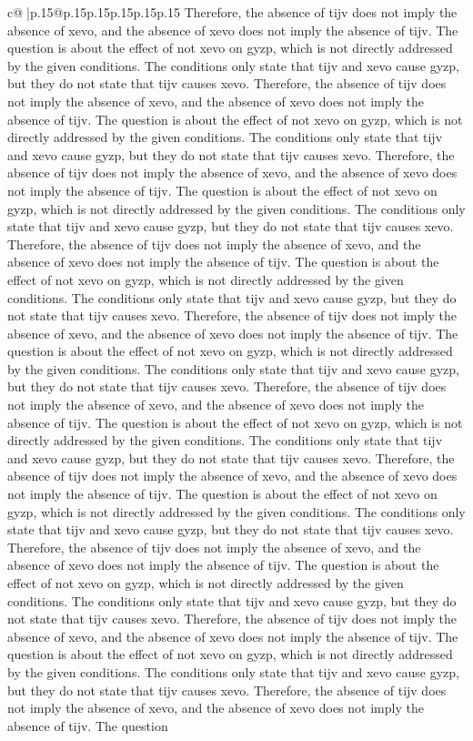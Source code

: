 \documentclass{article}
\begin{document}
{\begin{supertabular}{c@{$\;$}|p{.15\linewidth}@{}p{.15\linewidth}p{.15\linewidth}p{.15\linewidth}p{.15\linewidth}p{.15\linewidth}}
{{{Therefore, the absence of tijv does not imply the absence of xevo, and the absence of xevo does not imply the absence of tijv. The question is about the effect of not xevo on gyzp, which is not directly addressed by the given conditions. The conditions only state that tijv and xevo cause gyzp, but they do not state that tijv causes xevo. Therefore, the absence of tijv does not imply the absence of xevo, and the absence of xevo does not imply the absence of tijv. The question is about the effect of not xevo on gyzp, which is not directly addressed by the given conditions. The conditions only state that tijv and xevo cause gyzp, but they do not state that tijv causes xevo. Therefore, the absence of tijv does not imply the absence of xevo, and the absence of xevo does not imply the absence of tijv. The question is about the effect of not xevo on gyzp, which is not directly addressed by the given conditions. The conditions only state that tijv and xevo cause gyzp, but they do not state that tijv causes xevo. Therefore, the absence of tijv does not imply the absence of xevo, and the absence of xevo does not imply the absence of tijv. The question is about the effect of not xevo on gyzp, which is not directly addressed by the given conditions. The conditions only state that tijv and xevo cause gyzp, but they do not state that tijv causes xevo. Therefore, the absence of tijv does not imply the absence of xevo, and the absence of xevo does not imply the absence of tijv. The question is about the effect of not xevo on gyzp, which is not directly addressed by the given conditions. The conditions only state that tijv and xevo cause gyzp, but they do not state that tijv causes xevo. Therefore, the absence of tijv does not imply the absence of xevo, and the absence of xevo does not imply the absence of tijv. The question is about the effect of not xevo on gyzp, which is not directly addressed by the given conditions. The conditions only state that tijv and xevo cause gyzp, but they do not state that tijv causes xevo. Therefore, the absence of tijv does not imply the absence of xevo, and the absence of xevo does not imply the absence of tijv. The question is about the effect of not xevo on gyzp, which is not directly addressed by the given conditions. The conditions only state that tijv and xevo cause gyzp, but they do not state that tijv causes xevo. Therefore, the absence of tijv does not imply the absence of xevo, and the absence of xevo does not imply the absence of tijv. The question is about the effect of not xevo on gyzp, which is not directly addressed by the given conditions. The conditions only state that tijv and xevo cause gyzp, but they do not state that tijv causes xevo. Therefore, the absence of tijv does not imply the absence of xevo, and the absence of xevo does not imply the absence of tijv. The question is about the effect of not xevo on gyzp, which is not directly addressed by the given conditions. The conditions only state that tijv and xevo cause gyzp, but they do not state that tijv causes xevo. Therefore, the absence of tijv does not imply the absence of xevo, and the absence of xevo does not imply the absence of tijv. The question }}}
\end{supertabular}}
\end{document}
